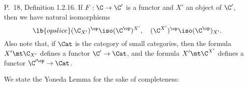 \documentclass[12pt]{article}
\theoremstyle{remark}
\theoremstyle{definition}
\begin{document}
%

\begin{s}
P.~18, Definition 1.2.16. If $F:\C\to\C'$ is a functor and $X'$ an object of $\C'$, then we have natural isomorphisms 
\begin{equation}\lb{opslice}
(\C_{X'})^{\op}\iso(\C^{\op})^{X'},\quad(\C^{X'})^{\op}\iso(\C^{\op})_{X'}.
\end{equation} 
Also note that, if $\Cat$ is the category of small categories, then the formula $X'\mt\C_{X'}$ defines a functor $\C'\to\Cat$, and the formula $X'\mt\C^{X'}$ defines a functor $\C'^{\op}\to\Cat$.
\end{s}



We state the Yoneda Lemma for the sake of completeness:
\end{document}
